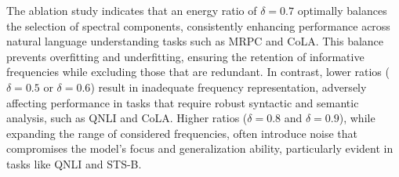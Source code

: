 The ablation study indicates that an energy ratio of \(\delta=0.7\) optimally balances the selection of spectral components, consistently enhancing performance across natural language understanding tasks such as MRPC and CoLA. This balance prevents overfitting and underfitting, ensuring the retention of informative frequencies while excluding those that are redundant. In contrast, lower ratios (\(\delta=0.5\) or \(\delta=0.6\)) result in inadequate frequency representation, adversely affecting performance in tasks that require robust syntactic and semantic analysis, such as QNLI and CoLA. Higher ratios (\(\delta=0.8\) and \(\delta=0.9\)), while expanding the range of considered frequencies, often introduce noise that compromises the model's focus and generalization ability, particularly evident in tasks like QNLI and STS-B.


